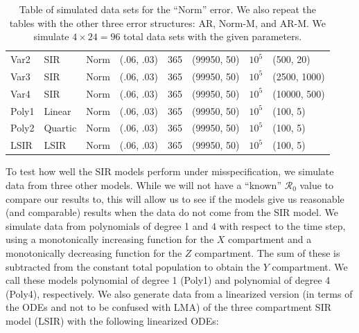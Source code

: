 \documentclass[12pt]{article}
\newcommand{\rr}{\ensuremath{\mathcal{R}_0}}
\begin{document}
\begin{table}[]
\begin{tabular}{@{}llllllll@{}}
  Var2      & SIR      &   Norm             & (.06, .03)                          &     365       &  (99950, 50)                    &  $10^5$          &(500, 20)                                \\
  Var3      & SIR      &   Norm             & (.06, .03)                          &     365       &  (99950, 50)                    &  $10^5$          &(2500, 1000)                                \\
  Var4      & SIR      &   Norm             & (.06, .03)                          &     365       &  (99950, 50)                    &  $10^5$          &(10000, 500)                                \\ \midrule
 Poly1     & Linear      &   Norm             & (.06, .03)                          &     365       &  (99950, 50)                    &  $10^5$          &(100, 5)                            \\
Poly2    & Quartic      &   Norm             & (.06, .03)                          &     365       &  (99950, 50)                    &  $10^5$          &(100, 5)                            \\ 
   LSIR     & LSIR      &   Norm             & (.06, .03)                          &     365       &  (99950, 50)                    &  $10^5$          &(100, 5)                            \\ 
  \bottomrule
\end{tabular}
\caption{Table of simulated data sets for the ``Norm'' error.  We also repeat the tables with the other three error structures: AR, Norm-M, and AR-M.  We simulate $4 \times 24=96$ total data sets with the given parameters.}
\label{tab:simulated-data}
\end{table}

To test how well the SIR models perform under misspecification, we simulate data from three other models. While we will not have a ``known'' $\rr$ value to compare our results to, this will allow us to see if the models give us reasonable (and comparable) results when the data do not come from the SIR model. We simulate data from polynomials of degree 1 and 4 with respect to the time step, using a monotonically increasing function for the $X$ compartment and a monotonically decreasing function for the $Z$ compartment.   The sum of these is subtracted from the constant total population to obtain the $Y$ compartment. We call these models polynomial of degree 1 (Poly1) and polynomial of degree 4 (Poly4), respectively. We also generate data from a linearized version (in terms of the ODEs and not to be confused with LMA) of the three compartment SIR model (LSIR) with the following linearized ODEs:
\end{document}
